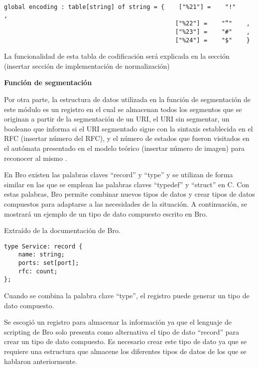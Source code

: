 \begin{verbatim}
global encoding : table[string] of string = {    ["%21"] =    "!"     ,
                                                ["%22"] =    "”"    ,                                        
                                                ["%23"] =    "#"    ,
                                                ["%24"] =    "$"    }
\end{verbatim}

La funcionalidad de esta tabla de codificación será explicada en la sección (insertar sección de implementación de normalización)


\textbf{Función de segmentación}

Por otra parte, la estructura de datos utilizada en la función de segmentación de este módulo es un registro en el cual se almacenan todos los segmentos que se originan a partir de la segmentación de un URI, el URI sin segmentar, un booleano que informa si el URI segmentado sigue con la sintaxis establecida en el RFC (insertar número del RFC), y el número de estados que fueron visitados en el autómata presentado en el modelo teórico (insertar número de imagen) para reconocer al mismo .


En Bro existen las palabras claves “record” y “type” y se utilizan de forma similar en las que se emplean las palabras claves “typedef” y “struct” en C. Con estas palabras, Bro permite combinar nuevos tipos de datos y crear tipos de datos compuestos para adaptarse a las necesidades de la situación. A continuación, se mostrará un ejemplo de un tipo de dato compuesto escrito en Bro.

Extraído de la documentación de Bro.

\begin{verbatim}
type Service: record {
    name: string;
    ports: set[port];
    rfc: count;
};
\end{verbatim}

Cuando se combina la palabra clave “type”, el registro puede generar un tipo de dato compuesto.

Se escogió un registro para almacenar la información ya que el lenguaje de scripting de Bro solo presenta como alternativa el tipo de dato “record” para crear un tipo de dato compuesto. Es necesario crear este tipo de dato ya que se requiere una estructura que almacene los diferentes tipos de datos de los que se hablaron anteriormente. 


